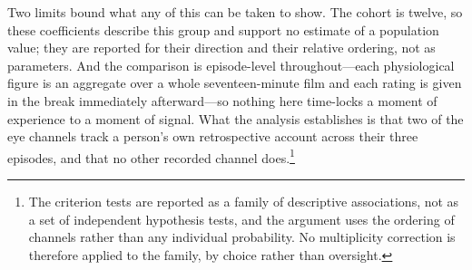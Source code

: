Two limits bound what any of this can be taken to show. The cohort is twelve, so these
coefficients describe this group and support no estimate of a population value; they are
reported for their direction and their relative ordering, not as parameters. And the
comparison is episode-level throughout---each physiological figure is an aggregate over a
whole seventeen-minute film and each rating is given in the break immediately afterward---so
nothing here time-locks a moment of experience to a moment of signal. What the analysis
establishes is that two of the eye channels track a person's own retrospective account across
their three episodes, and that no other recorded channel does.\footnote{The criterion tests are
reported as a family of descriptive associations, not as a set of independent hypothesis
tests, and the argument uses the ordering of channels rather than any individual probability.
No multiplicity correction is therefore applied to the family, by choice rather than
oversight.}

%


